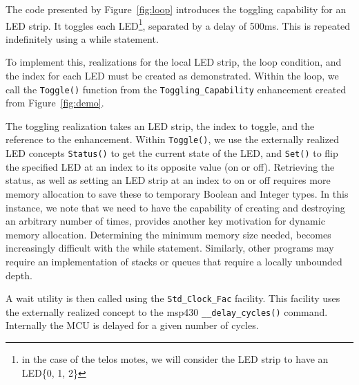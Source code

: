 The code presented by Figure~\ref{fig:loop} introduces the toggling capability for an LED strip. It toggles each LED\footnote{in the case of the telos motes, we will consider the LED strip to have an LED\{0, 1, 2\}}, separated by a delay of 500ms. This is repeated indefinitely using a while statement.

To implement this, realizations for the local LED strip, the loop condition, and the index for each LED must be created as demonstrated. Within the loop, we call the \texttt{Toggle()} function from the \texttt{Toggling\_Capability} enhancement created from Figure~\ref{fig:demo}. 


The toggling realization takes an LED strip, the index to toggle, and the reference to the enhancement. Within \texttt{Toggle()}, we use the externally realized LED concepts \texttt{Status()} to get the current state of the LED, and \texttt{Set()} to flip the specified LED at an index to its opposite value (on or off). Retrieving the status, as well as setting an LED strip at an index to on or off requires more memory allocation to save these to temporary Boolean and Integer types. In this instance, we note that we need to have the capability of creating and destroying an arbitrary number of times, provides another key motivation for dynamic memory allocation. Determining the minimum memory size needed, becomes increasingly difficult with the while statement. Similarly, other programs may require an implementation of stacks or queues that require a locally unbounded depth. 

A wait utility is then called using the \texttt{Std\_Clock\_Fac} facility. This facility uses the externally realized concept to the msp430 \texttt{\_\_delay\_cycles()} command. Internally the MCU is delayed for a given number of cycles. 

%
%
%
%
%
%
%
%
%
%
%
%
%
%
